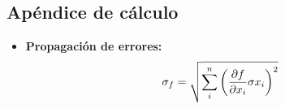 \documentclass[a4paper, reprint, showkeys, nofootinbib, twoside]{revtex4-1}
\begin{document}
\subsection{Apéndice de cálculo}
\label{Calculos}
\begin{itemize}
    
    \item \textbf{Propagación de errores:}
    \begin{equation}
        \centering
        \sigma_{f} = \sqrt{\sum_{i}^{n}\left(\frac{\partial f}{\partial x_{i}} \sigma x_{i}\right)^{2}}
        \label{eq: error_propagation}
    \end{equation}

\end{itemize}
\end{document}
